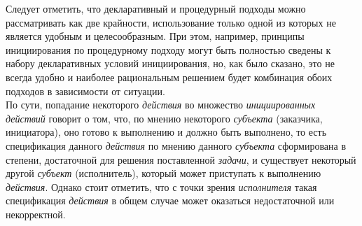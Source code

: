 \begin{SCn}
\begin{scnsubstruct}
\begin{scnindent}
\begin{scneqtoset}
\begin{scnindent}
{\begin{scnitemize}
		                    \end{scnitemize}
		                    Следует отметить, что декларативный и процедурный подходы можно рассматривать как две крайности, использование только одной из которых не является удобным и целесообразным. При этом, например, принципы инициирования по процедурному подходу могут быть полностью сведены к набору декларативных условий инициирования, но, как было сказано, это не всегда удобно и наиболее рациональным решением будет комбинация обоих подходов в зависимости от ситуации.
		                    \\По сути, попадание некоторого \textit{действия} во множество \textit{инициированных действий} говорит о том, что, по мнению некоторого \textit{субъекта} (заказчика, инициатора), оно готово к выполнению и должно быть выполнено, то есть спецификация данного \textit{действия} по мнению данного \textit{субъекта} сформирована в степени, достаточной для решения поставленной \textit{задачи}, и существует некоторый другой \textit{субъект} (исполнитель), который может приступать к выполнению \textit{действия}. Однако стоит отметить, что с точки зрения \textit{исполнителя} такая спецификация \textit{действия} в общем случае может оказаться недостаточной или некорректной.}
		            \end{scnindent}
		            \begin{scnindent}
\end{scnindent}
\end{scneqtoset}
\end{scnindent}
\end{scnsubstruct}
\end{SCn}
